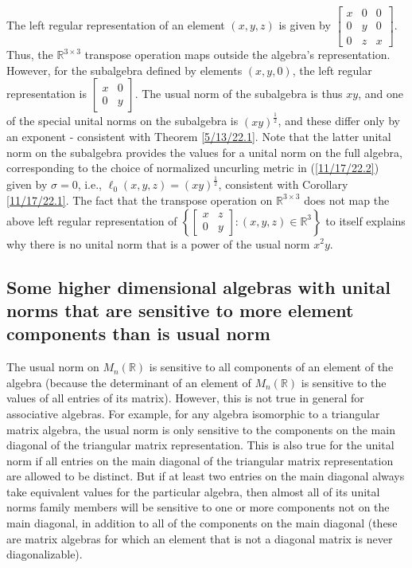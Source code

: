 \documentclass{amsart}
\numberwithin{equation}{section}
\theoremstyle{definition}
\numberwithin{theorem}{section}
\begin{document}
The left regular representation of an element $(x,y,z)$ is given by $\left[\begin{array}{ccc}
x & 0 & 0   \\
 0 & y & 0 \\ 0 & z & x    
\end{array} \right]$.  Thus, the $\mathbb{R}^{3\times 3}$ transpose operation maps outside the algebra's representation.  However, for the subalgebra defined by elements $(x,y,0)$, the left regular representation is 
 $\left[\begin{array}{ccc}
x & 0  \\
 0 & y  
\end{array} \right]$.  The usual norm of the subalgebra is thus $xy$, and one of the special unital norms on the subalgebra is $(xy)^{\frac{1}{2}}$, and these differ only by an exponent - consistent with Theorem \ref{5/13/22.1}.   Note that the latter unital norm on the subalgebra provides the values for a unital norm on the full algebra, corresponding to the choice of normalized uncurling metric in (\ref{11/17/22.2}) given by $\sigma = 0$, i.e., $\ell_0(x,y,z) = (xy)^{\frac{1}{2}}$, consistent with Corollary \ref{11/17/22.1}.  The fact that the transpose operation on $\mathbb{R}^{3\times 3}$ does not map the above left regular representation of $\left\{\left[\begin{array}{ccc}
x & z  \\
 0 & y  
\end{array} \right]:(x,y,z)\in \mathbb{R}^3\right\}$ to itself explains why there is no unital norm that is a power of the usual norm $x^2y$.
  
\subsection{Some higher dimensional algebras with unital norms that are sensitive to more element components than is  usual norm}

The usual norm on $ M_n(\mathbb{R})$ is sensitive to all components of an element of the algebra (because the determinant of an element of $ M_n(\mathbb{R})$  is sensitive to the values of all entries of its matrix).    However, this is not true in general for associative algebras.  For example, for any algebra isomorphic to a triangular matrix algebra, the usual norm is only sensitive to the components on the main diagonal of the triangular matrix representation.  This is also true for the unital norm if all entries on the main diagonal of the triangular matrix representation are allowed to be distinct.  But if  at least two entries on the main diagonal always take equivalent values for the particular algebra,  then almost all of its unital norms family members will be sensitive to one or more components not on the main diagonal, in addition to all of the components on the main diagonal (these are matrix algebras for which an element that is not a diagonal matrix is never diagonalizable).  
\end{document}
